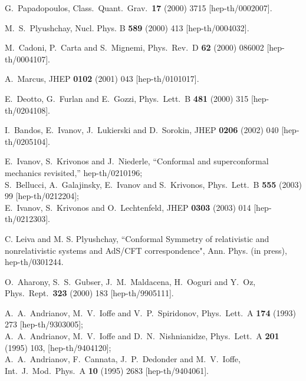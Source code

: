 \documentclass[a4paper,12pt]{article}
\begin{document}
\begin{thebibliography}{99}
G.~Papadopoulos,
Class.\ Quant.\ Grav.\  {\bf 17} (2000) 3715
[hep-th/0002007].


M.~S.~Plyushchay,
Nucl. Phys. B {\bf 589} (2000) 413
[hep-th/0004032].


M.~Cadoni, P.~Carta and S.~Mignemi,
Phys.\ Rev.\ D {\bf 62} (2000) 086002
[hep-th/0004107].



A.~Marcus,
JHEP {\bf 0102} (2001) 043
[hep-th/0101017].


E.~Deotto, G.~Furlan and E.~Gozzi,
Phys.\ Lett.\ B {\bf 481} (2000) 315
[hep-th/0204108].

I.~Bandos, E.~Ivanov, J.~Lukierski and D.~Sorokin,
JHEP {\bf 0206} (2002) 040
[hep-th/0205104].

E.~Ivanov, S.~Krivonos and J.~Niederle,
``Conformal and superconformal mechanics revisited,''
hep-th/0210196;\\
S.~Bellucci, A.~Galajinsky, E.~Ivanov and S.~Krivonos,
Phys.\ Lett.\ B {\bf 555} (2003) 99
[hep-th/0212204];\\
E.~Ivanov, S.~Krivonos and O.~Lechtenfeld,
JHEP {\bf 0303} (2003) 014
[hep-th/0212303].


C. Leiva and M. S. Plyushchay,
``Conformal Symmetry of relativistic and nonrelativistic
systems and AdS/CFT correspondence",
Ann. Phys. (in press),
hep-th/0301244.


O.~Aharony, S.~S.~Gubser, J.~M.~Maldacena, H.~Ooguri and
Y.~Oz,
Phys.\ Rept.\  {\bf 323} (2000) 183
[hep-th/9905111].


A.~A.~Andrianov, M.~V.~Ioffe and V.~P.~Spiridonov,
Phys.\ Lett.\ A {\bf 174} (1993) 273
[hep-th/9303005];\\
A.~A.~Andrianov, M.~V.~Ioffe and D.~N.~Nishnianidze,
Phys.\ Lett.\ A {\bf 201} (1995) 103,
[hep-th/9404120];\\
A.~A.~Andrianov, F.~Cannata, J.~P.~Dedonder and M.~V.~Ioffe,
Int.\ J.\ Mod.\ Phys.\ A {\bf 10} (1995) 2683
[hep-th/9404061].



\end{thebibliography}
\end{document}
